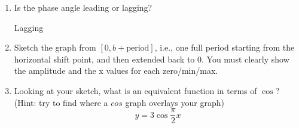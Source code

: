 \documentclass[letterpaper,12pt,fleqn]{article}
\begin{document}
\begin{enumerate}
\begin{enumerate}
\item Is the phase angle leading or lagging?

  Lagging
  
\item Sketch the graph from $[0, b+\mbox{period}]$, i.e., one full period
starting from the horizontal shift point, and then extended back to 0. You must
clearly show the amplitude and the x values for each zero/min/max.


\item Looking at your sketch, what is an equivalent function in terms of
$\cos$? (Hint: try to find where a $cos$ graph overlays your graph)
  \[y=3\cos\frac{\pi}{2}x\]
\end{enumerate}

\end{enumerate}
 
\end{document}
